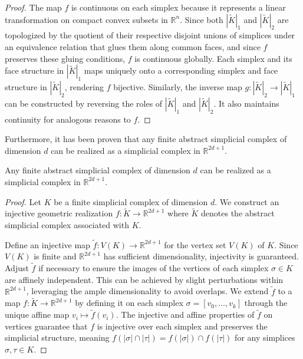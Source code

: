 \begin{proof}
	The map $f$ is continuous on each simplex because it represents a linear
	transformation on compact convex subsets in $\mathbb{R}^{n}$. Since both $|\tilde
	{K}|_{1}$ and $|\tilde{K}|_{2}$ are topologized by the quotient of their respective
	disjoint unions of simplices under an equivalence relation that glues them along
	common faces, and since $f$ preserves these gluing conditions, $f$ is continuous
	globally. Each simplex and its face structure in $|\tilde{K}|_{1}$ maps
	uniquely onto a corresponding simplex and face structure in $|\tilde{K}|_{2}$,
	rendering $f$ bijective. Similarly, the inverse map $g: |\tilde{K}|_{2} \to |\tilde
	{K}|_{1}$ can be constructed by reversing the roles of $|\tilde{K}|_{1}$ and $|
	\tilde{K}|_{2}$. It also maintains continuity for analogous reasons to $f$.
\end{proof}

Furthermore, it has been proven that any finite abstract simplicial complex of dimension
$d$ can be realized as a simplicial complex in $\mathbb{R}^{2d+1}$.

\begin{theorem}
	Any finite abstract simplicial complex of dimension $d$ can be realized as a simplicial
	complex in $\mathbb{R}^{2d+1}$.
\end{theorem}

\begin{proof}
	Let $K$ be a finite simplicial complex of dimension $d$. We construct an
	injective geometric realization $f: \tilde{K}\to \mathbb{R}^{2d+1}$ where
	$\tilde{K}$ denotes the abstract simplicial complex associated with $K$.

	Define an injective map $\tilde{f}: V(K) \to \mathbb{R}^{2d+1}$ for the vertex
	set $V(K)$ of $K$. Since $V(K)$ is finite and $\mathbb{R}^{2d+1}$ has sufficient
	dimensionality, injectivity is guaranteed. Adjust $\tilde{f}$ if necessary to ensure
	the images of the vertices of each simplex $\sigma \in K$ are affinely independent.
	This can be achieved by slight perturbations within $\mathbb{R}^{2d+1}$, leveraging
	the ample dimensionality to avoid overlaps. We extend $\tilde{f}$ to a map
	$f: \tilde{K}\to \mathbb{R}^{2d+1}$ by defining it on each simplex
	$\sigma = [v_{0}, \ldots, v_{k}]$ through the unique affine map
	$v_{i} \mapsto \tilde{f}(v_{i})$. The injective and affine properties of $\tilde
	{f}$ on vertices guarantee that $f$ is injective over each simplex and preserves
	the simplicial structure, meaning
	$f(|\sigma| \cap |\tau|) = f(|\sigma|) \cap f(|\tau|)$ for any simplices
	$\sigma, \tau \in K$.
\end{proof}

